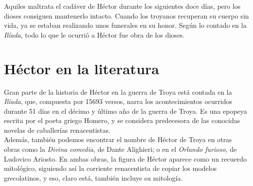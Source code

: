 \documentclass[12pt,a4paper]{article}
\begin{document}
Aquiles maltrata el cadáver de Héctor durante los siguientes doce días, pero los dioses consiguen mantenerlo intacto. Cuando los troyanos recuperan su cuerpo sin vida, ya se estaban realizando unos funerales en su honor\footnotemark. Según lo contado en la \textit{Ilíada}, todo lo que le ocurrió a Héctor fue obra de los dioses.


\section{Héctor en la literatura}
Gran parte de la historia de Héctor en la guerra de Troya está contada en la \textit{Ilíada}, que, compuesta por 15693 versos, narra los acontecimientos ocurridos durante 51 días en el décimo y último año de la guerra de Troya. Es una epopeya escrita por el poeta griego Homero, y se considera predecesora de las conocidas novelas de caballerías renacentistas.\\

Además, también podemos encontrar el nombre de Héctor de Troya en otras obras como la \textit{Divina comedia}\footnotemark, de Dante Alighieri; o en el \textit{Orlando furioso}\textit, de Ludovico Ariosto. En ambas obras, la figura de Héctor aparece como un recuerdo mitológico, siguiendo así la corriente renacentista de copiar los modelos grecolatinos, y eso, claro está, también incluye su mitología.

\end{document}
